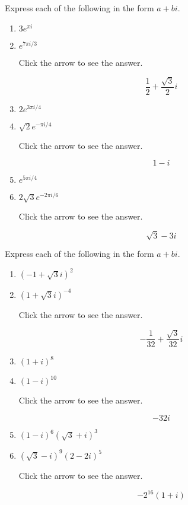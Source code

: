 \documentclass{ximera}
\begin{document}
\begin{problem}\label{prb:A.19}
Express each of the following in the form $a + bi$.

\begin{enumerate}
\item $3e^{\pi i}$
\item $e^{7\pi i/3}$

Click the arrow to see the answer.
\begin{expandable}
 $$\frac{1}{2} + \frac{\sqrt{3}}{2} i$$
\end{expandable}

\item $2e^{3 \pi i/4}$
\item $\sqrt{2}e^{-\pi i/4}$

Click the arrow to see the answer.
\begin{expandable}
 $$1 - i$$
\end{expandable}

\item $e^{5\pi i/4}$
\item $2\sqrt{3}e^{-2\pi i/6}$

Click the arrow to see the answer.
\begin{expandable}
 $$\sqrt{3} - 3i$$
\end{expandable}
\end{enumerate}
\end{problem}

\begin{problem}\label{prb:A.20}
Express each of the following in the form $a + bi$.

\begin{enumerate}
\item $(-1 + \sqrt{3}i)^2$
\item $(1 + \sqrt{3}i)^{-4}$

Click the arrow to see the answer.
\begin{expandable}
 $$-\frac{1}{32} + \frac{\sqrt{3}}{32}i$$
\end{expandable}

\item $(1 + i)^8$
\item $(1 - i)^{10}$

Click the arrow to see the answer.
\begin{expandable}
 $$-32i$$
\end{expandable}

\item $(1 - i)^{6}(\sqrt{3} + i)^{3}$
\item $(\sqrt{3} - i)^{9}(2 - 2i)^{5}$

Click the arrow to see the answer.
\begin{expandable}
 $$-2^{16}(1 + i)$$
\end{expandable}
\end{enumerate}
\end{problem}
\end{document}
